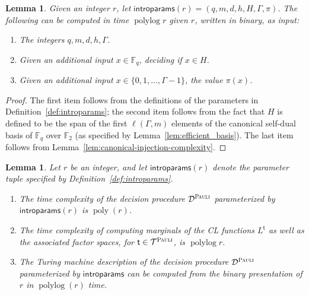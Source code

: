 \documentclass[11pt]{article}
\newtheorem{lemma}[theorem]{Lemma}
\theoremstyle{definition}
\newcommand{\F}{\ensuremath{\mathbb{F}}}
\DeclareMathOperator{\poly}{poly}
\DeclareMathOperator{\polylog}{polylog}
\newcommand{\decider}{\mathcal{D}}
\newcommand{\type}{\mathcal{T}}
\newcommand{\gamestyle}[1]{\ensuremath{\textsc{#1}}\xspace}
\newcommand{\pauli}{\gamestyle{Pauli}}
\newcommand{\tvarstyle}[1]{\mathsf{#1}}
\newcommand{\tvar}{\ensuremath{\tvarstyle{t}}}
\newcommand{\introparams}{\mathsf{introparams}}
\begin{document}
\begin{lemma}
	\label{lem:introparams-complexity}
	Given an integer $r$, let $\introparams(r) = (q,m,d,h,H,\Gamma,\pi)$.
  The following can be computed in time $\polylog r$ given $r$, written in
  binary, as input:
	\begin{enumerate}
		\item The integers $q,m,d,h,\Gamma$.
		\item Given an additional input $x \in \F_q$, deciding if $x\in H$.
		\item Given an additional input $x \in \{0, 1,\ldots,\Gamma-1\}$, the value
      $\pi(x)$.
	\end{enumerate}
\end{lemma}
\begin{proof}
  The first item follows from the definitions of the parameters in
  Definition~\ref{def:introparams}; the second item follows from the fact that
  $H$ is defined to be the span of the first $\ell(\Gamma,m)$ elements of the
  canonical self-dual basis of $\F_q$ over $\F_2$ (as specified by
  Lemma~\ref{lem:efficient_basis}).
  The last item follows from Lemma~\ref{lem:canonical-injection-complexity}.
\end{proof}

\begin{lemma}
  \label{lem:qld-complexity}
  Let $r$ be an integer, and let $\introparams(r)$ denote the parameter tuple
  specified by Definition~\ref{def:introparams}.
  \begin{enumerate}
	\item The time complexity of the decision procedure $\decider^\pauli$
    parameterized by $\introparams(r)$ is $\poly(r)$.
	\item The time complexity of computing marginals of the CL functions $L^\tvar$
    as well as the associated factor spaces, for $\tvar \in \type^\pauli$, is
    $\polylog r$.
	\item The Turing machine description of the decision procedure
    $\decider^\pauli$ parameterized by $\introparams$ can be computed from the
    binary presentation of $r$ in $\polylog (r)$ time.
  \end{enumerate}
\end{lemma}
\end{document}
